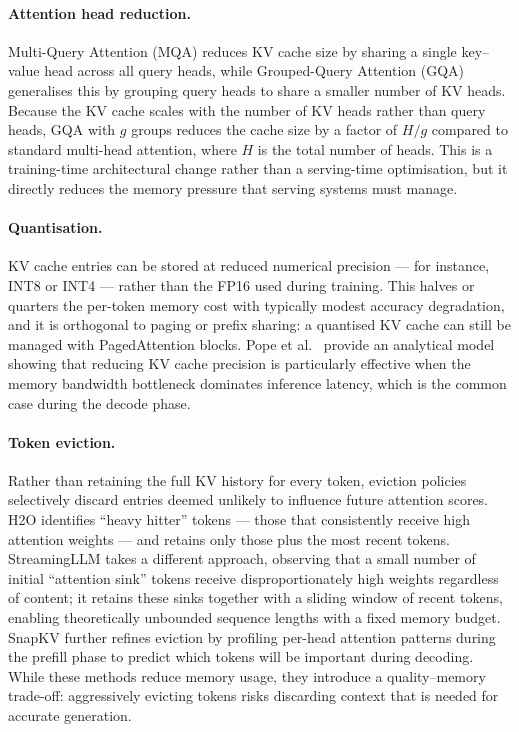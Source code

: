 \documentclass[10pt, a4paper]{article}
\begin{document}
\paragraph{Attention head reduction.}
Multi-Query Attention (MQA) \cite{shazeer2019mqa} reduces KV cache
size by sharing a single key--value head across all query heads, while
Grouped-Query Attention (GQA) \cite{ainslie2023gqa} generalises this
by grouping query heads to share a smaller number of KV heads.
Because the KV cache scales with the number of KV heads rather than
query heads, GQA with $g$ groups reduces the cache size by a factor
of $H / g$ compared to standard multi-head attention, where $H$ is the
total number of heads.
This is a training-time architectural change rather than a serving-time
optimisation, but it directly reduces the memory pressure that serving
systems must manage.

\paragraph{Quantisation.}
KV cache entries can be stored at reduced numerical precision --- for
instance, INT8 or INT4 --- rather than the FP16 used during training.
This halves or quarters the per-token memory cost with typically modest
accuracy degradation, and it is orthogonal to paging or prefix sharing:
a quantised KV cache can still be managed with PagedAttention blocks.
Pope et al.\ \cite{pope2022scaling} provide an analytical model
showing that reducing KV cache precision is particularly effective when
the memory bandwidth bottleneck dominates inference latency, which is
the common case during the decode phase.

\paragraph{Token eviction.}
Rather than retaining the full KV history for every token, eviction
policies selectively discard entries deemed unlikely to influence
future attention scores.
H2O \cite{zhang2023h2o} identifies ``heavy hitter'' tokens --- those
that consistently receive high attention weights --- and retains only
those plus the most recent tokens.
StreamingLLM \cite{xiao2024streamingllm} takes a different approach,
observing that a small number of initial ``attention sink'' tokens
receive disproportionately high weights regardless of content;
it retains these sinks together with a sliding window of recent tokens,
enabling theoretically unbounded sequence lengths with a fixed memory
budget.
SnapKV \cite{li2024snapkv} further refines eviction by profiling
per-head attention patterns during the prefill phase to predict which
tokens will be important during decoding.
While these methods reduce memory usage, they introduce a
quality--memory trade-off: aggressively evicting tokens risks discarding
context that is needed for accurate generation.
\end{document}
